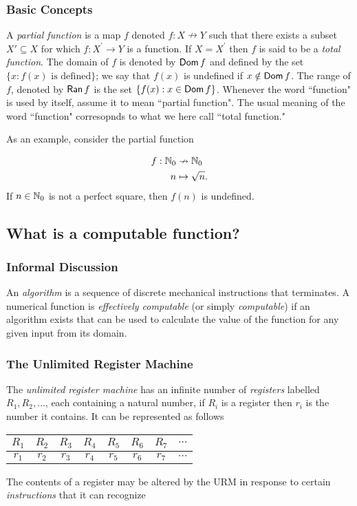 \subsubsection*{Basic Concepts}
A \emph{partial function} is a map $f$ denoted $f : X \nrightarrow Y$ such that there exists a subset $X' \subseteq X$ for which $f : X^\prime \to Y$ is a function. If $X = X^\prime$ then $f$ is said to be a \emph{total function}. The domain of $f$ is denoted by $\operatorname{\mathsf{Dom}} f$ and defined by the set $\{ x : f(x) \text{ is defined} \}$; we say that $f(x)$ is undefined if $x \notin \operatorname{\mathsf{Dom}} f$. The range of $f$, denoted by $\operatorname{\mathsf{Ran}} f$ is the set $\{ f(x) : x \in \operatorname{\mathsf{Dom}} f \}$. Whenever the word ``function" is used by itself, assume it to mean ``partial function". The usual meaning of the word ``function" corresopnds to what we here call ``total function." \par
As an example, consider the partial function

\begin{align*}
	f : \mathbb{N}_0  & \nrightarrow  \mathbb{N}_0 \\
		n  & \mapsto       \sqrt n.
\end{align*}
If $n \in \mathbb{N}_0$ is not a perfect square, then $f(n)$ is undefined. \par 

\subsection{What is a computable function?}
\subsubsection*{Informal Discussion}
An \emph{algorithm} is a sequence of discrete mechanical instructions that terminates. A numerical function is \emph{effectively computable} (or simply \emph{computable}) if an algorithm exists that can be used to calculate the value of the function for any given input from its domain.

\subsubsection*{The Unlimited Register Machine}
The \emph{unlimited register machine} has an infinite number of \emph{registers} labelled $R_1, R_2, \ldots$, each containing a natural number, if $R_i$ is a register then $r_i$ is the number it contains. It can be represented as follows

\begin{center}
	\begin{tabular}{|c|c|c|c|c|c|c|c}
		\hline
		$R_1$ & $R_2$ & $R_3$ & $R_4$ & $R_5$ & $R_6$ & $R_7$ & $\cdots$\\ 
		\hline
		$r_1$ & $r_2$ & $r_3$ & $r_4$ & $r_5$ & $r_6$ & $r_7$ & $\cdots$  \\
		\hline
	\end{tabular}
\end{center}
The contents of a register may be altered by the URM in response to certain \emph{instructions} that it can recognize

